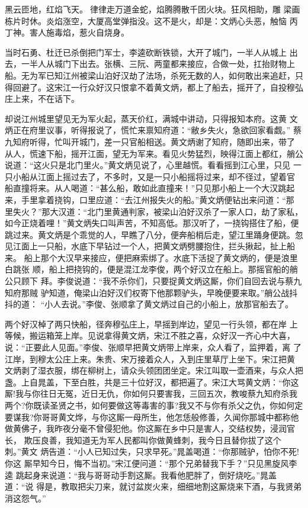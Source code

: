 黑云匝地，红焰飞天。律律走万道金蛇，焰腾腾散千团火块。狂风相助，雕
梁画栋片时休。炎焰涨空，大厦高堂弹指没。这不是火，却是：文炳心头恶，触恼
丙丁神。害人施毒焰，惹火自烧身。

当时石勇、杜迁已杀倒把门军士，李逵砍断铁锁，大开了城门，一半人从城上
出去，一半人从城门下出去。张横、三阮、两童都来接应，合做一处，扛抬财物上
船。无为军已知江州被梁山泊好汉劫了法场，杀死无数的人，如何敢出来追赶，只
得回避了。这宋江一行众好汉只恨拿不着黄文炳，都上了船去，摇开了，自投穆弘
庄上来，不在话下。

却说江州城里望见无为军火起，蒸天价红，满城中讲动，只得报知本府。这黄
文炳正在府里议事，听得报说了，慌忙来禀知府道：“敝乡失火，急欲回家看觑。”
蔡九知府听得，忙叫开城门，差一只官船相送。黄文炳谢了知府，随即出来，带了
从人，慌速下船，摇开江面，望无为军来。看见火势猛烈，映得江面上都红，艄公
说道：“这火只是北门里火。”黄文炳见说了，心里越慌。看看摇到江心里，只见
一只小船从江面上摇过去了，不多时，又是一只小船摇将过来，却不径过，望着官
船直撞将来。从人喝道：“甚么船，敢如此直撞来！”只见那小船上一个大汉跳起
来，手里拿着挠钩，口里应道：“去江州报失火的船。”黄文炳便钻出来问道：“那
里失火？”那大汉道：“北门里黄通判家，被梁山泊好汉杀了一家人口，劫了家私，
如今正烧着哩！”黄文炳失口叫声苦，不知高低。那汉听了，一挠钩搭住了船，便
跳过来。黄文炳是个乖觉的人，早瞧了八分，便奔船梢后走，望江里踊身便跳。忽
见江面上一只船，水底下早钻过一个人，把黄文炳劈腰抱住，拦头揪起，扯上船来。
船上那个大汉早来接应，便把麻索绑了。水底下活捉了黄文炳的，便是浪里白跳张
顺，船上把挠钩的，便是混江龙李俊，两个好汉立在船上。那摇官船的艄公只顾下
拜。李俊说道：“我不杀你们，只要捉黄文炳这厮，你们自回去说与蔡九知府那贼
驴知道，俺梁山泊好汉们权寄下他那颗驴头，早晚便要来取。”艄公战抖抖的道：
“小人去说。”李俊、张顺拿了黄文炳过自己的小船上，放那官船去了。

两个好汉棹了两只快船，径奔穆弘庄上，早摇到岸边，望见一行头领，都在岸
上等候，搬运箱笼上岸。见说拿得黄文炳，宋江不胜之喜，众好汉一齐心中大喜，
说：“正要此人见面。”李俊、张顺早把黄文炳带上岸来，众人看了，监押着，离
了江岸，到穆太公庄上来。朱贵、宋万接着众人，入到庄里草厅上坐下。宋江把黄
文炳剥了湿衣服，绑在柳树上，请众头领团团坐定。宋江叫取一壶酒来，与众人把
盏。上自晁盖，下至白胜，共是三十位好汉，都把遍了。宋江大骂黄文炳：“你这
厮!我与你往日无冤，近日无仇，你如何只要害我，三回五次，教唆蔡九知府杀我
两个?你既读圣贤之书，如何要做这等毒害的事?我又不与你有杀父之仇，你如何定
要谋我?你哥哥黄文烨，与你这厮一母所生，他怎恁般修善，久闻你那城中都称他
做黄佛子，我昨夜分毫不曾侵犯他。你这厮在乡中只是害人，交结权势，浸润官长，
欺压良善，我知道无为军人民都叫你做黄蜂刺，我今日且替你拔了这个刺。”黄文
炳告道：“小人已知过失，只求早死。”晁盖喝道：“你那贼驴，怕你不死!你这
厮早知今日，悔不当初。”宋江便问道：“那个兄弟替我下手？”只见黑旋风李逵
跳起身来说道：“我与哥哥动手割这厮。我看他肥胖了，倒好烧吃。”晁盖道：“说
得是，教取把尖刀来，就讨盆炭火来，细细地割这厮烧来下酒，与我贤弟消这怨气。”

